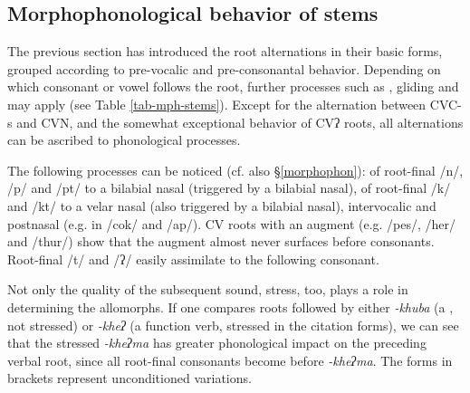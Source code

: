\subsection{Morphophonological behavior of stems}\label{stem-2}

The previous section has introduced the root alternations in their basic forms, grouped according to pre-vocalic and pre-consonantal behavior. Depending on which consonant or vowel follows the root, further processes such as , gliding and  may apply (see Table \ref{tab-mph-stems}).  Except for the alternation between CVC-s and CVN, and the somewhat exceptional behavior of CVʔ roots, all alternations can be ascribed to phonological processes.

The following processes can be noticed (cf. also §\ref{morphophon}):  of root-final /n/, /p/ and /pt/ to a bilabial nasal (triggered by a bilabial nasal),  of root-final /k/ and /kt/ to  a velar nasal (also triggered by a bilabial nasal), intervocalic and postnasal  (e.g. in /cok/ and /ap/). CV roots with an augment (e.g. /pes/, /her/ and /thur/) show that the augment almost never surfaces before consonants. Root-final /t/ and /ʔ/ easily assimilate to the following consonant.

Not only the quality of the subsequent sound,  stress, too, plays a role in determining the allomorphs. If one compares roots followed by either \emph{-khuba} (a , not stressed) or \emph{-kheʔ} (a function verb, stressed in the citation forms), we can see that the stressed \emph{-kheʔma} has greater phonological impact on the preceding verbal root, since all root-final consonants become  before \emph{-kheʔma}. The forms in brackets represent unconditioned variations.

